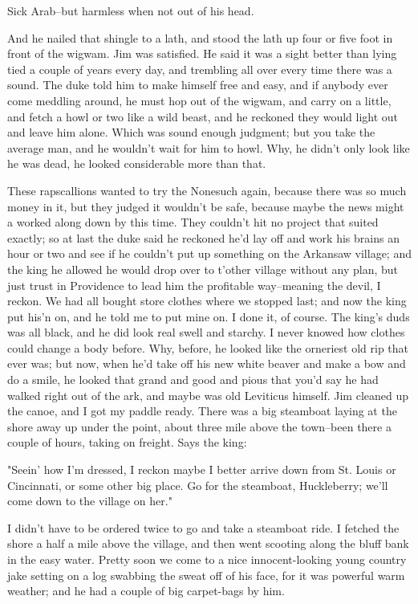Sick Arab--but harmless when not out of his head.

And he nailed that shingle to a lath, and stood the lath up four or five
foot in front of the wigwam.  Jim was satisfied.  He said it was a sight
better than lying tied a couple of years every day, and trembling all
over every time there was a sound.  The duke told him to make himself
free and easy, and if anybody ever come meddling around, he must hop out
of the wigwam, and carry on a little, and fetch a howl or two like a wild
beast, and he reckoned they would light out and leave him alone.  Which
was sound enough judgment; but you take the average man, and he wouldn't
wait for him to howl.  Why, he didn't only look like he was dead, he
looked considerable more than that.

These rapscallions wanted to try the Nonesuch again, because there was so
much money in it, but they judged it wouldn't be safe, because maybe the
news might a worked along down by this time.  They couldn't hit no
project that suited exactly; so at last the duke said he reckoned he'd
lay off and work his brains an hour or two and see if he couldn't put up
something on the Arkansaw village; and the king he allowed he would drop
over to t'other village without any plan, but just trust in Providence to
lead him the profitable way--meaning the devil, I reckon.  We had all
bought store clothes where we stopped last; and now the king put his'n
on, and he told me to put mine on.  I done it, of course.  The king's
duds was all black, and he did look real swell and starchy.  I never
knowed how clothes could change a body before.  Why, before, he looked
like the orneriest old rip that ever was; but now, when he'd take off his
new white beaver and make a bow and do a smile, he looked that grand and
good and pious that you'd say he had walked right out of the ark, and
maybe was old Leviticus himself.  Jim cleaned up the canoe, and I got my
paddle ready.  There was a big steamboat laying at the shore away up
under the point, about three mile above the town--been there a couple
of hours, taking on freight.  Says the king:

"Seein' how I'm dressed, I reckon maybe I better arrive down from St.
Louis or Cincinnati, or some other big place.  Go for the steamboat,
Huckleberry; we'll come down to the village on her."

I didn't have to be ordered twice to go and take a steamboat ride.  I
fetched the shore a half a mile above the village, and then went scooting
along the bluff bank in the easy water.  Pretty soon we come to a nice
innocent-looking young country jake setting on a log swabbing the sweat
off of his face, for it was powerful warm weather; and he had a couple of
big carpet-bags by him.

